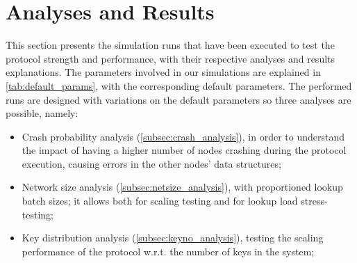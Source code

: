 \documentclass[11pt,twocolumn,letterpaper]{article}
\begin{document}
	\section{Analyses and Results}
	\label{sec:analyses}
	This section presents the simulation runs that have been executed to test the protocol strength and performance, with their respective analyses and results explanations. The parameters involved in our simulations are explained in \cref{tab:default_params}, with the corresponding default parameters. The performed runs are designed with variations on the default parameters so three analyses are possible, namely:

	\begin{itemize}
		\item Crash probability analysis (\cref{subsec:crash_analysis}), in order to understand the impact of having a higher number of nodes crashing during the protocol execution, causing errors in the other nodes' data structures;
		\item Network size analysis (\cref{subsec:netsize_analysis}), with proportioned lookup batch sizes; it allows both for scaling testing and for lookup load stress-testing;
		\item Key distribution analysis (\cref{subsec:keyno_analysis}), testing the scaling performance of the protocol w.r.t. the number of keys in the system;
	\end{itemize}
	
\end{document}
